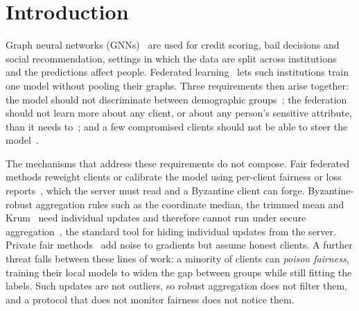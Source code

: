 \section{Introduction}\label{sec:intro}

Graph neural networks (GNNs)~\citep{kipf2016semi,velickovic2017graph} are used for credit scoring, bail decisions and social recommendation, settings in which the data are split across institutions and the predictions affect people. Federated learning~\citep{mcmahan2017communication} lets such institutions train one model without pooling their graphs. Three requirements then arise together: the model should not discriminate between demographic groups~\citep{dai2021say,agarwal2021towards}; the federation should not learn more about any client, or about any person's sensitive attribute, than it needs to~\citep{abadi2016deep,mcmahan2018learning}; and a few compromised clients should not be able to steer the model~\citep{blanchard2017krum,yin2018byzantine,baruch2019little}.

The mechanisms that address these requirements do not compose. Fair federated methods reweight clients or calibrate the model using per-client fairness or loss reports~\citep{ezzeldin2023fairfed,li2020fair,fedfact2025}, which the server must read and a Byzantine client can forge. Byzantine-robust aggregation rules such as the coordinate median, the trimmed mean and Krum~\citep{yin2018byzantine,blanchard2017krum} need individual updates and therefore cannot run under secure aggregation~\citep{bonawitz2017practical}, the standard tool for hiding individual updates from the server. Private fair methods~\citep{corbucci2024puffle,ling2024feddp} add noise to gradients but assume honest clients. A further threat falls between these lines of work: a minority of clients can \emph{poison fairness}, training their local models to widen the gap between groups while still fitting the labels. Such updates are not outliers, so robust aggregation does not filter them, and a protocol that does not monitor fairness does not notice them.

